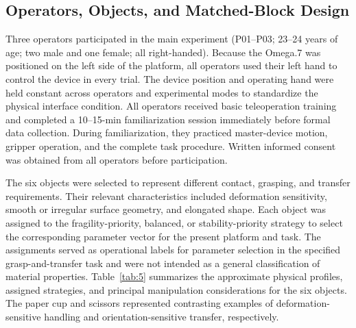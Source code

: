 \subsection{Operators, Objects, and Matched-Block Design}
Three operators participated in the main experiment (P01--P03; 23--24 years of age; two male and one female; all right-handed). Because the Omega.7 was positioned on the left side of the platform, all operators used their left hand to control the device in every trial. The device position and operating hand were held constant across operators and experimental modes to standardize the physical interface condition. All operators received basic teleoperation training and completed a 10--15-min familiarization session immediately before formal data collection. During familiarization, they practiced master-device motion, gripper operation, and the complete task procedure. Written informed consent was obtained from all operators before participation.

The six objects were selected to represent different contact, grasping, and transfer requirements. Their relevant characteristics included deformation sensitivity, smooth or irregular surface geometry, and elongated shape. Each object was assigned to the fragility-priority, balanced, or stability-priority strategy to select the corresponding parameter vector for the present platform and task. The assignments served as operational labels for parameter selection in the specified grasp-and-transfer task and were not intended as a general classification of material properties. Table~\ref{tab:5} summarizes the approximate physical profiles, assigned strategies, and principal manipulation considerations for the six objects. The paper cup and scissors represented contrasting examples of deformation-sensitive handling and orientation-sensitive transfer, respectively.

